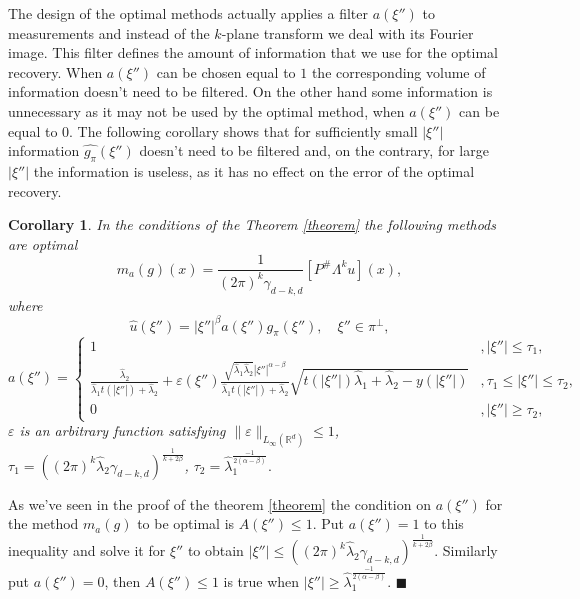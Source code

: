 \documentclass[12pt]{iopart}
\newtheorem{corollary}{Corollary}
\newenvironment{proof}
{\par\noindent{\bf Proof}}
{\hfill$\scriptstyle\blacksquare$}
\begin{document}
	The design of the optimal methods actually applies a filter $a(\xi'')$ to measurements and instead of the $k$-plane transform we deal with its Fourier image. This filter defines the amount of information that we use for the optimal recovery. When $a(\xi'')$ can be chosen equal to $1$ the corresponding volume of information doesn't need to be filtered. On the other hand some information is unnecessary as it may not be used by the optimal method, when $a(\xi'')$ can be equal to $0$. The following corollary shows that for sufficiently small  $|\xi''|$ information $\widehat{g_\pi}(\xi'')$ doesn't need to be filtered and, on the contrary, for large  $|\xi''|$ the information is useless, as it  has no effect on the error of the optimal recovery.
	
	\begin{corollary}
		\label{cor}
		In the conditions of the Theorem \ref{theorem} the following methods are optimal 
		$$m_a(g)(x) = \frac{1}{(2\pi)^k\gamma_{d-k,d}}[P^\#\Lambda^ku](x),$$
		where	
		$$\widehat{u}(\xi'')=|\xi''|^\beta a(\xi'')\widehat{g_\pi }(\xi''),\quad \xi''\in\pi^\perp,$$
		\[
		a(\xi'')=
		\begin{cases}
		1& ,|\xi''|\leqslant \tau_1,\\
		\frac{\widehat\lambda_2}{\widehat\lambda_1t(|\xi''|)+\widehat\lambda_2}+\varepsilon(\xi'')\frac{\sqrt{\widehat\lambda_1\widehat\lambda_2}|\xi''|^{\alpha-\beta}}{\widehat\lambda_1t(|\xi''|)+\widehat\lambda_2}\sqrt{t(|\xi''|)\widehat\lambda_1+\widehat\lambda_2-y(|\xi''|)}& ,\tau_1 \leqslant|\xi''|\leqslant\tau_2,\\
		0 &,|\xi''|\geqslant\tau_2,
		\end{cases}
		\]
		$\varepsilon$ is an arbitrary function satisfying $\|\varepsilon\|_{L_\infty(\mathbb R^d)}\leqslant 1$, $\tau_1=((2\pi)^k\widehat\lambda_2\gamma_{d-k,d})^\frac{1}{k+2\beta}$, $\tau_2=\widehat\lambda_1^{\frac{-1}{2(\alpha-\beta)}}.$
	\end{corollary}
	
	\begin{proof}
		As we've seen in the proof of the theorem \ref{theorem} the condition on $a(\xi'')$ for the method $m_a(g)$ to be optimal is $A(\xi'')\leqslant 1$. Put $a(\xi'')=1$ to this inequality and solve it for $\xi''$ to obtain $|\xi''|\leqslant ((2\pi)^k\widehat\lambda_2\gamma_{d-k,d})^\frac{1}{k+2\beta}$. Similarly put $a(\xi'')=0$,
		then $A(\xi'')\leqslant 1$ is true when $|\xi''|\geqslant
		\widehat\lambda_1^{\frac{-1}{2(\alpha-\beta)}}$.
	\end{proof}
	
\end{document}
